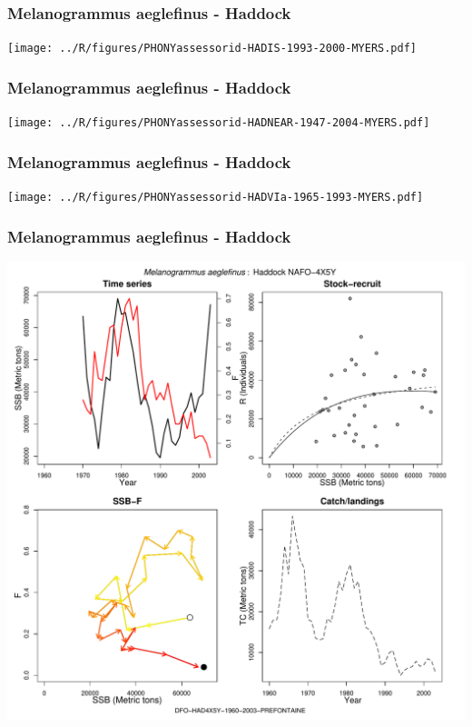 \subsubsection{Melanogrammus aeglefinus - Haddock}
\begin{center}
\texttt{[image: ../R/figures/PHONYassessorid-HADIS-1993-2000-MYERS.pdf]}
\end{center}

\subsubsection{Melanogrammus aeglefinus - Haddock}
\begin{center}
\texttt{[image: ../R/figures/PHONYassessorid-HADNEAR-1947-2004-MYERS.pdf]}
\end{center}

\subsubsection{Melanogrammus aeglefinus - Haddock}
\begin{center}
\texttt{[image: ../R/figures/PHONYassessorid-HADVIa-1965-1993-MYERS.pdf]}
\end{center}

\subsubsection{Melanogrammus aeglefinus - Haddock}
\begin{center}
\includegraphics[width=1.2\textwidth]{../R/figures/DFO-HAD4X5Y-1960-2003-PREFONTAINE.pdf}
\end{center}

